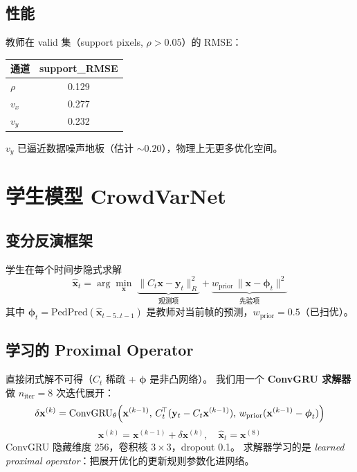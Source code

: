 \documentclass[11pt,a4paper]{ctexart}
\begin{document}
\subsection{性能}

教师在 valid 集（support pixels, $\rho > 0.05$）的 RMSE：
\begin{center}
\begin{tabular}{lc}
\toprule
通道 & support\_RMSE \\
\midrule
$\rho$    & 0.129 \\
$v_x$     & 0.277 \\
$v_y$     & 0.232 \\
\bottomrule
\end{tabular}
\end{center}

$v_y$ 已逼近数据噪声地板（估计 $\sim 0.20$），物理上无更多优化空间。

\section{学生模型 CrowdVarNet}

\subsection{变分反演框架}

学生在每个时间步隐式求解
\begin{equation}\label{eq:varprob}
\hat{\mathbf{x}}_t = \arg\min_{\mathbf{x}}\;
\underbrace{\lVert C_t\mathbf{x} - \mathbf{y}_t \rVert_{R}^2}_{\text{观测项}}
+\underbrace{w_{\text{prior}}\,\lVert\mathbf{x} - \boldsymbol{\phi}_t\rVert^2}_{\text{先验项}}
\end{equation}
其中 $\boldsymbol{\phi}_t = \mathrm{PedPred}(\hat{\mathbf{x}}_{t-5..t-1})$ 是教师对当前帧的预测，$w_{\text{prior}}=0.5$（已扫优）。

\subsection{学习的 Proximal Operator}

直接闭式解不可得（$C_t$ 稀疏 + $\boldsymbol{\phi}$ 是非凸网络）。
我们用一个 \textbf{ConvGRU 求解器}做 $n_{\text{iter}}=8$ 次迭代展开：
\begin{equation}
\delta\mathbf{x}^{(k)} = \mathrm{ConvGRU}_\theta\Bigl(
\mathbf{x}^{(k-1)},\,
C_t^{\!\top}(\mathbf{y}_t - C_t\mathbf{x}^{(k-1)}),\,
w_{\text{prior}}(\mathbf{x}^{(k-1)}-\boldsymbol{\phi}_t)
\Bigr)
\end{equation}
\begin{equation}
\mathbf{x}^{(k)} = \mathbf{x}^{(k-1)} + \delta\mathbf{x}^{(k)}, \quad
\hat{\mathbf{x}}_t = \mathbf{x}^{(8)}
\end{equation}
ConvGRU 隐藏维度 256，卷积核 $3\times 3$，dropout 0.1。
求解器学习的是 \textit{learned proximal operator}：把展开优化的更新规则参数化进网络。
\end{document}

